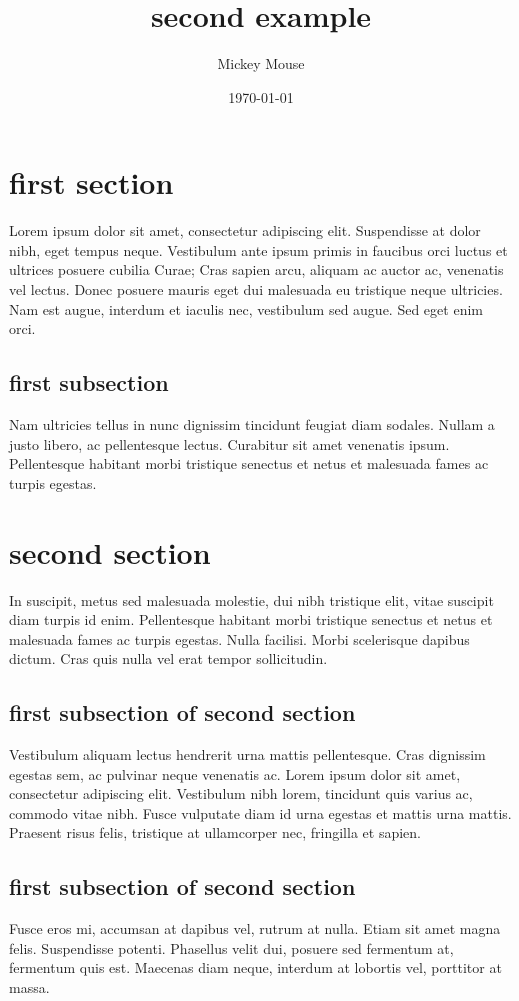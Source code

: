 \documentclass[a4paper]{book}
\author{Mickey Mouse}
\date{\today}
\title{second example}
\begin{document}
\maketitle

\tableofcontents

\chapter{first section}

Lorem ipsum dolor sit amet, consectetur adipiscing elit. Suspendisse at dolor
nibh, eget tempus neque. Vestibulum ante ipsum primis in faucibus orci luctus
et ultrices posuere cubilia Curae; Cras sapien arcu, aliquam ac auctor ac,
venenatis vel lectus. Donec posuere mauris eget dui malesuada eu tristique
neque ultricies. Nam est augue, interdum et iaculis nec, vestibulum sed augue.
Sed eget enim orci.


\section{first subsection}

Nam ultricies tellus in nunc dignissim tincidunt feugiat diam sodales. Nullam a
justo libero, ac pellentesque lectus. Curabitur sit amet venenatis ipsum.
Pellentesque habitant morbi tristique senectus et netus et malesuada fames ac
turpis egestas.


\chapter{second section}

In suscipit, metus sed malesuada molestie, dui nibh tristique elit, vitae
suscipit diam turpis id enim. Pellentesque habitant morbi tristique senectus et
netus et malesuada fames ac turpis egestas. Nulla facilisi. Morbi scelerisque
dapibus dictum. Cras quis nulla vel erat tempor sollicitudin.


\section{first subsection of second section}

Vestibulum aliquam lectus hendrerit urna mattis pellentesque. Cras dignissim
egestas sem, ac pulvinar neque venenatis ac. Lorem ipsum dolor sit amet,
consectetur adipiscing elit. Vestibulum nibh lorem, tincidunt quis varius ac,
commodo vitae nibh. Fusce vulputate diam id urna egestas et mattis urna mattis.
Praesent risus felis, tristique at ullamcorper nec, fringilla et sapien.


\section{first subsection of second section}

Fusce eros mi, accumsan at dapibus vel, rutrum at nulla. Etiam sit amet magna
felis. Suspendisse potenti. Phasellus velit dui, posuere sed fermentum at,
fermentum quis est. Maecenas diam neque, interdum at lobortis vel, porttitor
at massa.
\end{document}
